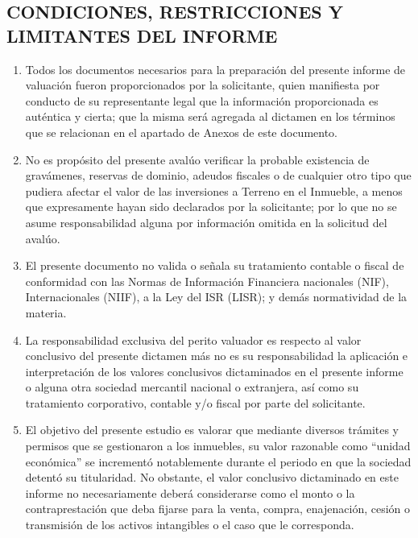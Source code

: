 \subsection{CONDICIONES, RESTRICCIONES Y LIMITANTES DEL INFORME}

\begin{enumerate}[\indent a)]

\item Todos los documentos necesarios para la preparación del presente informe de valuación fueron proporcionados por la solicitante, quien manifiesta por conducto de su representante legal que la información proporcionada es auténtica y cierta; que la misma será agregada al dictamen en los términos que se relacionan en el apartado de Anexos de este documento.

\item No es propósito del presente avalúo verificar la probable existencia de gravámenes, reservas de dominio, adeudos fiscales o de cualquier otro tipo que pudiera afectar el valor de las inversiones a Terreno en el Inmueble, a menos que expresamente hayan sido declarados por la solicitante; por lo que no se asume responsabilidad alguna por información omitida en la solicitud del avalúo.

\item El presente documento no valida o señala su tratamiento contable o fiscal de conformidad con las Normas de Información Financiera nacionales (NIF), Internacionales (NIIF), a la Ley del ISR (LISR); y demás normatividad de la materia.

\item La responsabilidad exclusiva del perito valuador es respecto al valor conclusivo del presente dictamen más no es su responsabilidad la aplicación e interpretación de los valores conclusivos dictaminados en el presente informe o alguna otra sociedad mercantil nacional o extranjera, así como su tratamiento corporativo, contable y/o fiscal por parte del solicitante.

\item El objetivo del presente estudio es valorar que mediante diversos trámites y permisos que se gestionaron a los inmuebles, su valor razonable como ``unidad económica'' se incrementó notablemente durante el periodo en que la sociedad \textcolor{principal}{\empresaCorto} detentó su titularidad. No obstante, el valor conclusivo dictaminado en este informe no necesariamente deberá considerarse como el monto o la contraprestación que deba fijarse para la venta, compra, enajenación, cesión o transmisión de los activos intangibles o el caso que le corresponda.


\end{enumerate}
